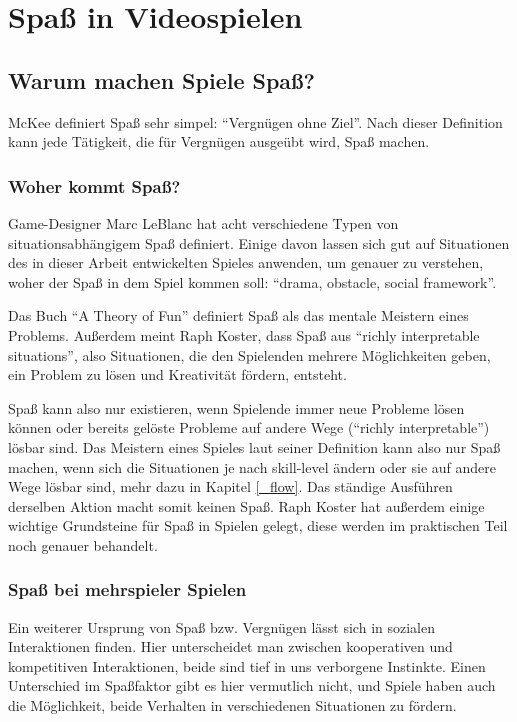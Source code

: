 \chapter{Spaß in Videospielen}

\section{Warum machen Spiele Spaß?}

McKee definiert Spaß sehr simpel: "`Vergnügen ohne Ziel"'. Nach dieser Definition kann jede Tätigkeit, die für Vergnügen ausgeübt wird, Spaß machen\cite{_fun}.

\subsection{Woher kommt Spaß?}

Game-Designer Marc LeBlanc hat acht verschiedene Typen von situationsabhängigem Spaß definiert. Einige davon lassen sich gut auf Situationen des in dieser Arbeit entwickelten Spieles anwenden, um genauer zu verstehen, woher der Spaß in dem Spiel kommen soll: "`drama, obstacle, social framework"'. 

Das Buch "`A Theory of Fun"'\cite{_theory_of_fun} definiert Spaß als das mentale Meistern eines Problems\cite[S. 71]{_theory_of_fun}. Außerdem meint Raph Koster, dass Spaß aus "`richly interpretable situations"'\cite[S. 40]{_theory_of_fun}, also Situationen, die den Spielenden mehrere Möglichkeiten geben, ein Problem zu lösen und Kreativität fördern, entsteht.

Spaß kann also nur existieren, wenn Spielende immer neue Probleme lösen können oder bereits gelöste Probleme auf andere Wege ("`richly interpretable"') lösbar sind. Das Meistern eines Spieles laut seiner Definition kann also nur Spaß machen, wenn sich die Situationen je nach skill-level ändern oder sie auf andere Wege lösbar sind, mehr dazu in Kapitel \ref{_flow}. Das ständige Ausführen derselben Aktion macht somit keinen Spaß. Raph Koster hat außerdem einige wichtige Grundsteine für Spaß in Spielen gelegt, diese werden im praktischen Teil noch genauer behandelt.

\subsection{Spaß bei mehrspieler Spielen}

Ein weiterer Ursprung von Spaß bzw. Vergnügen lässt sich in sozialen Interaktionen finden\cite[S. 72]{_theory_of_fun}. Hier unterscheidet man zwischen kooperativen und kompetitiven Interaktionen, beide sind tief in uns verborgene Instinkte\cite[S. 310]{_art_of_gamedesign}. Einen Unterschied im Spaßfaktor gibt es hier vermutlich nicht\cite{_competition_vs_cooperation}, und Spiele haben auch die Möglichkeit, beide Verhalten in verschiedenen Situationen zu fördern.

